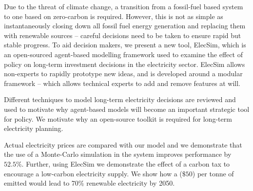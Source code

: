 Due to the threat of climate change, a transition from a fossil-fuel based system to one based on zero-carbon is required. However, this is not as simple as instantaneously closing down all fossil fuel energy generation and replacing them with renewable sources -- careful decisions need to be taken to ensure rapid but stable progress. To aid decision makers, we present a new tool, ElecSim, which is an open-sourced agent-based modelling framework used to examine the effect of policy on long-term investment decisions in the electricity sector. ElecSim allows non-experts to rapidly prototype new ideas, and is developed around a modular framework -- which allows technical experts to add and remove features at will. 

Different techniques to model long-term electricity decisions are reviewed and used to motivate why agent-based models will become an important strategic tool for policy. We motivate why an open-source toolkit is required for long-term electricity planning.

Actual electricity prices are compared with our model and we demonstrate that the use of a Monte-Carlo simulation in the system improves performance by $52.5\%$. Further, using ElecSim we demonstrate the effect of a carbon tax to encourage a low-carbon electricity supply. We show how a  ($\$50$) per tonne of  emitted would lead to 70\% renewable electricity by 2050. 
